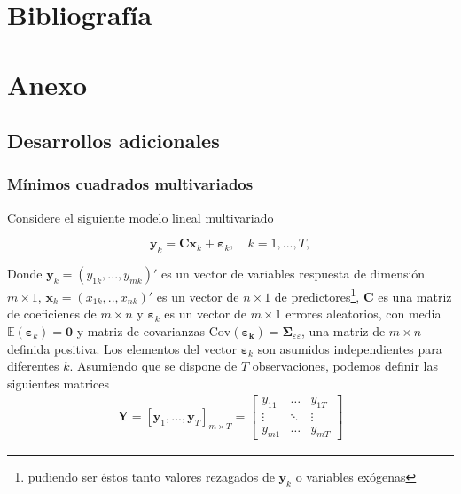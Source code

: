 \documentclass[12pt, twoside]{book}\usepackage[]{graphicx}\usepackage[]{color}
\let\bold\boldsymbol
\let\bf\mathbf
\numberwithin{equation}{section}
\numberwithin{theorem}{section}
\numberwithin{teorema}{section}
\numberwithin{defi}{section}
\numberwithin{prop}{section}
\numberwithin{defi}{section}
\theoremstyle{plain}
\begin{document}
\chapter{Bibliografía}

\printbibliography

\chapter{Anexo}
\begingroup
\renewcommand\thesection{A}
\titleformat{\section}[display]
{\normalfont\huge\bfseries}{}{20pt}{\huge}

\section{Desarrollos adicionales}
\subsection{Mínimos cuadrados multivariados}

Considere el siguiente modelo lineal multivariado 

\begin{equation}\label{MLS}
\bf{y}_{k} = \bf{C}\bf{x}_{k}+\boldsymbol{\varepsilon}_{k}, \quad k=1,...,T, 
\end{equation}

Donde $\bf{y}_{k}= (y_{1k},...,y_{mk})'$ es un vector de variables respuesta de dimensión $m\times 1$, $\bf{x}_{k}=(x_{1k},..,x_{nk})'$ es un vector de $n\times 1$ de predictores\footnote{pudiendo ser éstos tanto valores rezagados de $\bf{y}_{k}$ o variables exógenas}, $\bf{C}$ es una matriz de coeficienes de $m\times n$ y $\boldsymbol{\varepsilon}_{k}$ es un vector de $m\times 1$ errores aleatorios, con media $\mathbb{E}(\boldsymbol{\varepsilon}_{k})=\bf{0}$ y matriz de covarianzas $\text{Cov}(\boldsymbol{\varepsilon_{k}})=\bold{\Sigma}_{\varepsilon\varepsilon}$, una matriz de $m\times n$ definida positiva. Los elementos del vector $\boldsymbol{\varepsilon}_{k}$ son asumidos independientes para diferentes $k$. Asumiendo que se dispone de $T$ observaciones, podemos definir las siguientes matrices 
\begin{align}
\bf{Y} = \left[\bf{y}_{1},...,\bf{y}_{T} \right]_{m\times T} = \left[
\begin{array}{ccc} 
y_{11} & \hdots & y_{1T} \\ 
\vdots & \ddots & \vdots \\ 
y_{m1} & \hdots & y_{mT}
\end{array}\right] 
\end{align}
\end{document}
